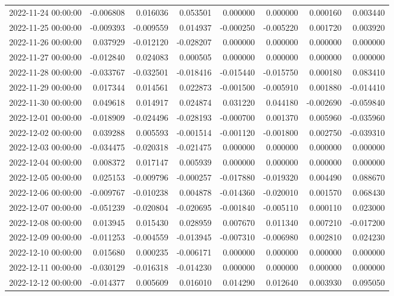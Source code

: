 \begin{tabular}{lrrrrrrr}
2022-11-24 00:00:00 & -0.006808 & 0.016036 & 0.053501 & 0.000000 & 0.000000 & 0.000160 & 0.003440 \\
2022-11-25 00:00:00 & -0.009393 & -0.009559 & 0.014937 & -0.000250 & -0.005220 & 0.001720 & 0.003920 \\
2022-11-26 00:00:00 & 0.037929 & -0.012120 & -0.028207 & 0.000000 & 0.000000 & 0.000000 & 0.000000 \\
2022-11-27 00:00:00 & -0.012840 & 0.024083 & 0.000505 & 0.000000 & 0.000000 & 0.000000 & 0.000000 \\
2022-11-28 00:00:00 & -0.033767 & -0.032501 & -0.018416 & -0.015440 & -0.015750 & 0.000180 & 0.083410 \\
2022-11-29 00:00:00 & 0.017344 & 0.014561 & 0.022873 & -0.001500 & -0.005910 & 0.001880 & -0.014410 \\
2022-11-30 00:00:00 & 0.049618 & 0.014917 & 0.024874 & 0.031220 & 0.044180 & -0.002690 & -0.059840 \\
2022-12-01 00:00:00 & -0.018909 & -0.024496 & -0.028193 & -0.000700 & 0.001370 & 0.005960 & -0.035960 \\
2022-12-02 00:00:00 & 0.039288 & 0.005593 & -0.001514 & -0.001120 & -0.001800 & 0.002750 & -0.039310 \\
2022-12-03 00:00:00 & -0.034475 & -0.020318 & -0.021475 & 0.000000 & 0.000000 & 0.000000 & 0.000000 \\
2022-12-04 00:00:00 & 0.008372 & 0.017147 & 0.005939 & 0.000000 & 0.000000 & 0.000000 & 0.000000 \\
2022-12-05 00:00:00 & 0.025153 & -0.009796 & -0.000257 & -0.017880 & -0.019320 & 0.004490 & 0.088670 \\
2022-12-06 00:00:00 & -0.009767 & -0.010238 & 0.004878 & -0.014360 & -0.020010 & 0.001570 & 0.068430 \\
2022-12-07 00:00:00 & -0.051239 & -0.020804 & -0.020695 & -0.001840 & -0.005110 & 0.000110 & 0.023000 \\
2022-12-08 00:00:00 & 0.013945 & 0.015430 & 0.028959 & 0.007670 & 0.011340 & 0.007210 & -0.017200 \\
2022-12-09 00:00:00 & -0.011253 & -0.004559 & -0.013945 & -0.007310 & -0.006980 & 0.002810 & 0.024230 \\
2022-12-10 00:00:00 & 0.015680 & 0.000235 & -0.006171 & 0.000000 & 0.000000 & 0.000000 & 0.000000 \\
2022-12-11 00:00:00 & -0.030129 & -0.016318 & -0.014230 & 0.000000 & 0.000000 & 0.000000 & 0.000000 \\
2022-12-12 00:00:00 & -0.014377 & 0.005609 & 0.016010 & 0.014290 & 0.012640 & 0.003930 & 0.095050 \\

\end{tabular}
